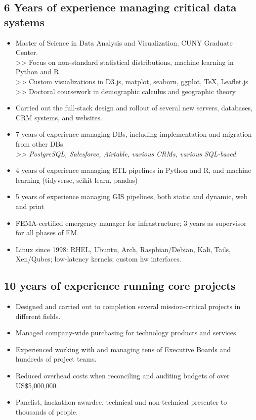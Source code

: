 \documentclass[]{deedy-resume-openfont}
\begin{document}
\subsection{6 Years of experience managing critical data systems}
\vspace{\topsep}
    \begin{itemize}
        \item Master of Science in Data Analysis and Visualization, CUNY Graduate Center. \\
        >> Focus on non-standard statistical distributions, machine learning in Python and R \\
        >> Custom visualizations in D3.js, matplot, seaborn, ggplot, \TeX, Leaflet.js \\
        >> Doctoral coursework in demographic calculus and geographic theory
        \item Carried out the full-stack design and rollout of several new servers, databases, CRM systems, and websites.
        \item 7 years of experience managing DBs, including implementation and migration from other DBs \\ \textit{>> PostgreSQL, Salesforce, Airtable, various CRMs, various SQL-based}
        \item 4 years of experience managing ETL pipelines in Python and R, and machine learning (tidyverse, scikit-learn, pandas)
        \item 5 years of experience managing GIS pipelines, both static and dynamic, web and print
        \item FEMA-certified emergency manager for infrastructure; 3 years as supervisor for all phases of EM.
        \item Linux since 1998: RHEL, Ubuntu, Arch, Raspbian/Debian, Kali, Tails, Xen/Qubes; low-latency kernels; custom hw interfaces.
    \end{itemize}
\subsection{10 years of experience running core projects}
\vspace{\topsep}
\begin{itemize} 
    \item Designed and carried out to completion several mission-critical projects in different fields.
    \item Managed company-wide purchasing for technology products and services.
    \item Experienced working with and managing tens of Executive Boards and hundreds of project teams.
    \item Reduced overhead costs when reconciling and auditing budgets of over US\$5,000,000.
    \item Panelist, hackathon awardee, technical and non-technical presenter to thousands of people.
	\end{itemize}
\end{document}
